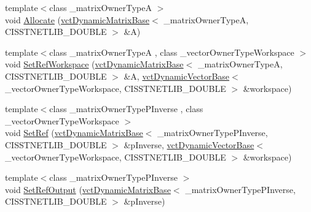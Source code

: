 \begin{DoxyCompactItemize}
\item 
{\footnotesize template$<$class \-\_\-matrix\-Owner\-Type\-A $>$ }\\void \hyperlink{classnmr_p_inverse_dynamic_data_aa37d3d41feecd5c89a8e77192230ab9a}{Allocate} (\hyperlink{classvct_dynamic_matrix_base}{vct\-Dynamic\-Matrix\-Base}$<$ \-\_\-matrix\-Owner\-Type\-A, C\-I\-S\-S\-T\-N\-E\-T\-L\-I\-B\-\_\-\-D\-O\-U\-B\-L\-E $>$ \&A)
\item 
{\footnotesize template$<$class \-\_\-matrix\-Owner\-Type\-A , class \-\_\-vector\-Owner\-Type\-Workspace $>$ }\\void \hyperlink{classnmr_p_inverse_dynamic_data_a29684ce8c84265d7e2c9d5133f39cd15}{Set\-Ref\-Workspace} (\hyperlink{classvct_dynamic_matrix_base}{vct\-Dynamic\-Matrix\-Base}$<$ \-\_\-matrix\-Owner\-Type\-A, C\-I\-S\-S\-T\-N\-E\-T\-L\-I\-B\-\_\-\-D\-O\-U\-B\-L\-E $>$ \&A, \hyperlink{classvct_dynamic_vector_base}{vct\-Dynamic\-Vector\-Base}$<$ \-\_\-vector\-Owner\-Type\-Workspace, C\-I\-S\-S\-T\-N\-E\-T\-L\-I\-B\-\_\-\-D\-O\-U\-B\-L\-E $>$ \&workspace)
\item 
{\footnotesize template$<$class \-\_\-matrix\-Owner\-Type\-P\-Inverse , class \-\_\-vector\-Owner\-Type\-Workspace $>$ }\\void \hyperlink{classnmr_p_inverse_dynamic_data_a002d887ccce780a84cf53c689f537004}{Set\-Ref} (\hyperlink{classvct_dynamic_matrix_base}{vct\-Dynamic\-Matrix\-Base}$<$ \-\_\-matrix\-Owner\-Type\-P\-Inverse, C\-I\-S\-S\-T\-N\-E\-T\-L\-I\-B\-\_\-\-D\-O\-U\-B\-L\-E $>$ \&p\-Inverse, \hyperlink{classvct_dynamic_vector_base}{vct\-Dynamic\-Vector\-Base}$<$ \-\_\-vector\-Owner\-Type\-Workspace, C\-I\-S\-S\-T\-N\-E\-T\-L\-I\-B\-\_\-\-D\-O\-U\-B\-L\-E $>$ \&workspace)
\item 
{\footnotesize template$<$class \-\_\-matrix\-Owner\-Type\-P\-Inverse $>$ }\\void \hyperlink{classnmr_p_inverse_dynamic_data_a84d5d2005be7dde90b725b18589439d1}{Set\-Ref\-Output} (\hyperlink{classvct_dynamic_matrix_base}{vct\-Dynamic\-Matrix\-Base}$<$ \-\_\-matrix\-Owner\-Type\-P\-Inverse, C\-I\-S\-S\-T\-N\-E\-T\-L\-I\-B\-\_\-\-D\-O\-U\-B\-L\-E $>$ \&p\-Inverse)
\end{DoxyCompactItemize}
